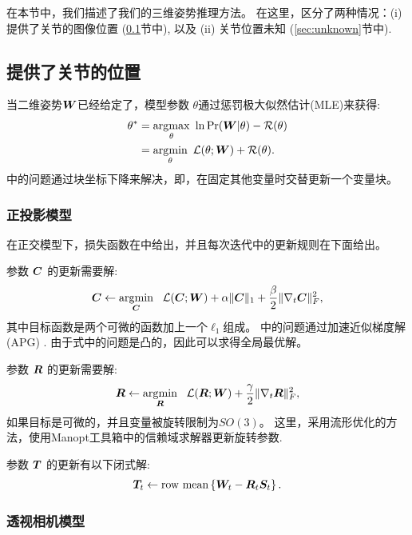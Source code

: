 
在本节中，我们描述了我们的三维姿势推理方法。 在这里，区分了两种情况：(i) 提供了关节的图像位置 (\ref{sec:known}节中), 以及
(ii) 关节位置未知 (\ref{sec:unknown}节中).

\subsection{提供了关节的位置}\label{sec:known}

当二维姿势${\bm{W}}$已经给定了，模型参数 $\theta$通过惩罚极大似然估计(MLE)来获得:
\begin{align}\label{eq:pmle}
\theta^* &= \operatorname*{arg\!\max}_{\theta} ~ \ln\mbox{Pr}({\bm{W}}|\theta) - \mathcal{R}(\theta) \nonumber \\
& = \operatorname*{arg\!\min}_{\theta} ~ \mathcal{L}(\theta;{\bm{W}}) + \mathcal{R}(\theta).
\end{align}
  中的问题通过块坐标下降来解决，即，在固定其他变量时交替更新一个变量块。

\subsubsection{正投影模型}

在正交模型下，损失函数在中给出，并且每次迭代中的更新规则在下面给出。

参数 ${\bm{C}}$ 的更新需要解:
\begin{align}\label{eq:C-step}
{\bm{C}} \leftarrow \operatorname*{arg\!\min}_{{\bm{C}}} ~~ \mathcal{L}({\bm{C}};{\bm{W}}) + \alpha\|{\bm{C}}\|_1 + \frac{\beta}{2}\|\nabla_t{\bm{C}}\|_F^2,
\end{align}
其中目标函数是两个可微的函数加上一个$\ell_1$组成。
中的问题通过加速近似梯度解(APG) \cite{nesterov2007gradient}.
由于式中的问题是凸的，因此可以求得全局最优解。 

参数 ${\bm{R}}$ 的更新需要解:
\begin{align}\label{eq:R-step}
{\bm{R}} \leftarrow \operatorname*{arg\!\min}_{{\bm{R}}} ~~ \mathcal{L}({\bm{R}};{\bm{W}}) + \frac{\gamma}{2}\|\nabla_t{\bm{R}}\|_F^2,
\end{align}
如果目标是可微的，并且变量被旋转限制为$SO(3)$。 这里，采用流形优化的方法，使用Manopt工具箱中的信赖域求解器更新旋转参数\cite{boumal2014manopt}.

参数 ${\bm{T}}$ 的更新有以下闭式解:
\begin{align}\label{eq:T-step}
{\bm{T}}_t \leftarrow \mbox{row mean}\left\{{\bm{W}}_t - {\bm{R}}_t{\bm{S}}_t\right\}.
\end{align}

\subsubsection{透视相机模型}


